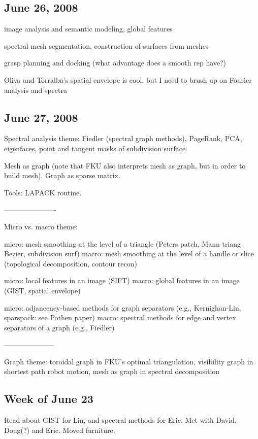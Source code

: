 \documentclass[11pt]{article}
\begin{document}
\subsection{June 26, 2008}

image analysis and semantic modeling, global features

spectral mesh segmentation, construction of surfaces from meshes

grasp planning and docking (what advantage does a smooth rep have?)

Oliva and Torralba's spatial envelope is cool, but I need to brush up on Fourier analysis and spectra

\subsection{June 27, 2008}

Spectral analysis theme: Fiedler (spectral graph methods), PageRank, PCA, eigenfaces, 
                         point and tangent masks of subdivision surface.

Mesh as graph (note that FKU also interprets mesh as graph, but in order to build mesh).
Graph as sparse matrix.

Tools: LAPACK routine.

----------------------

Micro vs. macro theme: 

micro: mesh smoothing at the level of a triangle (Peters patch, Mann triang Bezier, subdivision surf)
macro: mesh smoothing at the level of a handle or slice (topological decomposition, contour recon)

micro: local features in an image (SIFT)
macro: global features in an image (GIST, spatial envelope)

micro: adjancency-based methods for graph separators (e.g., Kernighan-Lin, sparspack: see Pothen paper)
macro: spectral methods for edge and vertex separators of a graph (e.g., Fiedler)

---------------------

Graph theme: toroidal graph in FKU's optimal triangulation, 
             visibility graph in shortest path robot motion,
             mesh as graph in spectral decomposition

\subsection{Week of June 23}

Read about GIST for Lin, and spectral methods for Eric.
Met with David, Doug(?) and Eric.
Moved furniture.
\end{document}
